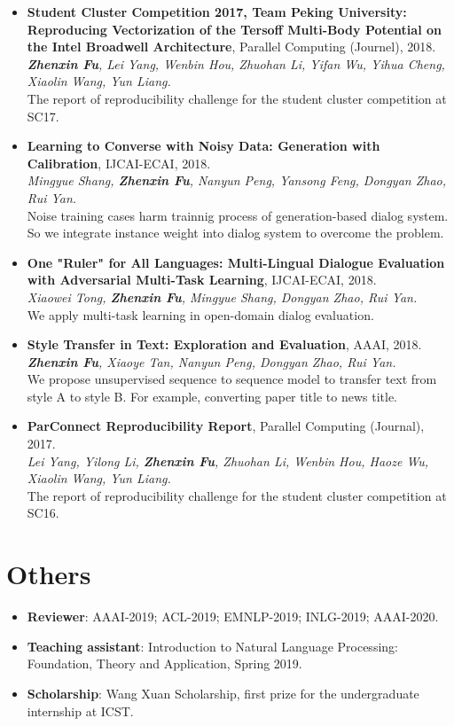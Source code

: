 \documentclass[letterpaper]{article}
\begin{document}
\begin{itemize}
\item \textbf{Student Cluster Competition 2017, Team Peking University: Reproducing Vectorization of the Tersoff Multi-Body Potential on the Intel Broadwell Architecture}, Parallel Computing (Journel), 2018. \\
{\it \textbf{Zhenxin Fu}, Lei Yang, Wenbin Hou, Zhuohan Li, Yifan Wu, Yihua Cheng, Xiaolin Wang, Yun Liang.} \\
  The report of reproducibility challenge for the student cluster competition at SC17.

\item \textbf{Learning to Converse with Noisy Data: Generation with Calibration}, IJCAI-ECAI, 2018. \\
  {\it Mingyue Shang, \textbf{Zhenxin Fu}, Nanyun Peng, Yansong Feng, Dongyan Zhao, Rui Yan.}  \\
  Noise training cases harm trainnig process of generation-based dialog system. So we integrate instance weight into dialog system to overcome the problem.

\item \textbf{One "Ruler" for All Languages: Multi-Lingual Dialogue Evaluation with Adversarial Multi-Task Learning}, IJCAI-ECAI, 2018. \\
  {\it Xiaowei Tong, \textbf{Zhenxin Fu}, Mingyue Shang, Dongyan Zhao, Rui Yan.} \\
  We apply multi-task learning in open-domain dialog evaluation.

\item \textbf{Style Transfer in Text: Exploration and Evaluation}, AAAI, 2018. \\
  {\it \textbf{Zhenxin Fu}, Xiaoye Tan, Nanyun Peng, Dongyan Zhao, Rui Yan.} \\
  We propose unsupervised sequence to sequence model to transfer text from style A to style B. For example, converting paper title to news title.
  
\item \textbf{ParConnect Reproducibility Report}, Parallel Computing (Journal), 2017.\\
  {\it Lei Yang, Yilong Li, \textbf{Zhenxin Fu}, Zhuohan Li, Wenbin Hou, Haoze Wu, Xiaolin Wang, Yun Liang.} \\
  The report of reproducibility challenge for the student cluster competition at SC16.
\end{itemize}


\section*{Others}
\begin{itemize}
  \item \textbf{Reviewer}: AAAI-2019; ACL-2019; EMNLP-2019; INLG-2019; AAAI-2020.
  \item \textbf{Teaching assistant}: Introduction to Natural Language Processing: Foundation, Theory and Application, Spring 2019.
  \item \textbf{Scholarship}: Wang Xuan Scholarship, first prize for the undergraduate internship at ICST.
\end{itemize}
\end{document}
